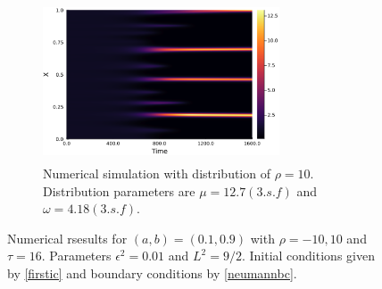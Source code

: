 \begin{figure}[H]
    \hfill
    \begin{subfigure}[t]{0.45\textwidth}
        \centering
        \includegraphics[width=7cm,height=4.75cm]{t1610.png}
        \caption{Numerical simulation with distribution of $\rho=10$. Distribution parameters are $\mu=12.7(3.s.f)$ and $\omega=4.18(3.s.f)$.}
        \label{}
    \end{subfigure}
    \caption{Numerical rsesults for $(a,b)=(0.1,0.9)$ with $\rho=-10,10$ and $\tau=16$. Parameters $\epsilon^2=0.01$ and $L^2=9/2$. Initial conditions given by \eqref{firstic} and boundary conditions by \eqref{neumannbc}.}
    \label{fig:linskew3}
\end{figure}
